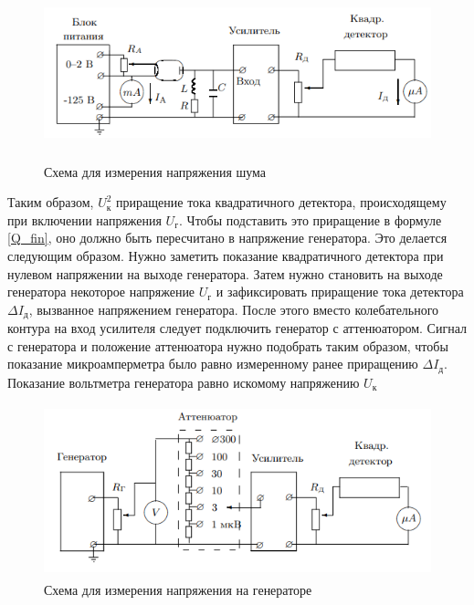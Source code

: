 \documentclass[12pt,a4paper]{article}
\begin{document}
\begin{figure}[H]
	\begin{center}
		\includegraphics[width=15cm, height=5cm]{VPV-3_4}
	\end{center}
	\centering \caption{Схема для измерения напряжения шума}
	\label{img4}
\end{figure}

\par Таким образом, $U_\text{к}^2$ приращение тока квадратичного детектора, происходящему при включении напряжения $U_\text{г}$. Чтобы подставить это приращение в формуле \ref{Q_fin}, оно должно быть пересчитано в напряжение генератора. Это делается следующим образом. Нужно заметить показание квадратичного детектора при нулевом напряжении на выходе генератора. Затем нужно становить на выходе генератора некоторое напряжение $U_\text{г}$ и зафиксировать приращение тока детектора $\Delta{I_\text{д}}$, вызванное напряжением генератора. После этого вместо колебательного контура на вход усилителя следует подключить генератор с аттенюатором. Сигнал с генератора и положение аттенюатора нужно подобрать таким образом, чтобы показание микроамперметра было равно измеренному ранее приращению $\Delta{I_\text{д}}$. Показание вольтметра генератора равно искомому напряжению $U_\text{к}$ 

\begin{figure}[H]
	\begin{center}
		\includegraphics[width=15cm, height=5cm]{VPV-3_5}
	\end{center}
	\centering \caption{Схема для измерения напряжения на генераторе}
	\label{img4}
\end{figure}
\end{document}
